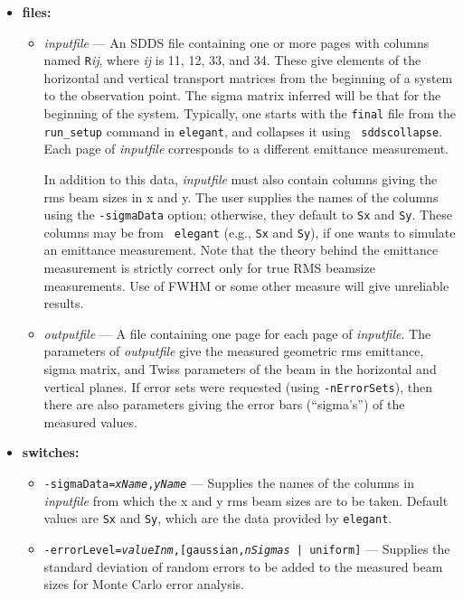 \documentclass[11pt]{article}
\begin{document}
\begin{itemize}
\item {\bf files:}
\begin{itemize}

\item {\em inputfile} --- An SDDS file containing one or more pages
with columns named \verb|R|{\em ij}, where {\em ij} is 11, 12, 33, and
34.  These give elements of the horizontal and vertical transport
matrices from the beginning of a system to the observation point.  The
sigma matrix inferred will be that for the beginning of the system.
Typically, one starts with the {\tt final} file from the {\tt
run\_setup} command in {\tt elegant}, and collapses it using {\tt
sddscollapse}.  Each page of {\em inputfile} corresponds to a different
emittance measurement.

In addition to this data, {\em inputfile} must also contain columns
giving the rms beam sizes in x and y.  The user supplies the names of
the columns using the \verb|-sigmaData| option; otherwise, they
default to \verb|Sx| and \verb|Sy|.  These columns may be from {\tt
elegant} (e.g., \verb|Sx| and \verb|Sy|), if one wants to simulate an
emittance measurement.  Note that the theory behind the emittance
measurement is strictly correct only for true RMS beamsize
measurements.  Use of FWHM or some other measure will give unreliable
results.
 
\item {\em outputfile} --- A file containing one page for each page of
{\em inputfile}.  The parameters of {\em outputfile} give the measured
geometric rms emittance, sigma matrix, and Twiss parameters of the 
beam in the horizontal and vertical planes.  If error sets were requested
(using \verb|-nErrorSets|), then there are also parameters giving the
error bars (``sigma's'') of the measured values.

\end{itemize}

\item {\bf switches:}
\begin{itemize}

\item {\tt -sigmaData={\em xName},{\em yName}} --- Supplies the names
of the columns in {\em inputfile} from which the x and y rms beam
sizes are to be taken.  Default values are {\tt Sx} and {\tt Sy},
which are the data provided by {\tt elegant}.

\item {\tt -errorLevel={\em valueInm},[{gaussian,{\em nSigmas} |
uniform}]} --- Supplies the standard deviation of random errors to be
added to the measured beam sizes for Monte Carlo error analysis.


\end{itemize}
\end{itemize}
\end{document}
